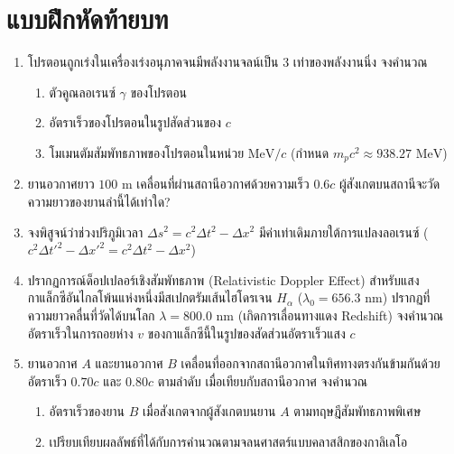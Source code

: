 \section{แบบฝึกหัดท้ายบท}
\begin{enumerate}
    \item โปรตอนถูกเร่งในเครื่องเร่งอนุภาคจนมีพลังงานจลน์เป็น 3 เท่าของพลังงานนิ่ง จงคำนวณ
    \begin{enumerate}
        \item ตัวคูณลอเรนซ์ $\gamma$ ของโปรตอน
        \item อัตราเร็วของโปรตอนในรูปสัดส่วนของ $c$
        \item โมเมนตัมสัมพัทธภาพของโปรตอนในหน่วย $\text{MeV}/c$ (กำหนด $m_p c^2 \approx 938.27\text{ MeV}$)
    \end{enumerate}
    \item ยานอวกาศยาว $100\text{ m}$ เคลื่อนที่ผ่านสถานีอวกาศด้วยความเร็ว $0.6c$ ผู้สังเกตบนสถานีจะวัดความยาวของยานลำนี้ได้เท่าใด?
    \item จงพิสูจน์ว่าช่วงปริภูมิเวลา $\Delta s^2 = c^2 \Delta t^2 - \Delta x^2$ มีค่าเท่าเดิมภายใต้การแปลงลอเรนซ์ ($c^2 \Delta t'^2 - \Delta x'^2 = c^2 \Delta t^2 - \Delta x^2$)
    \item ปรากฏการณ์ด็อปเปลอร์เชิงสัมพัทธภาพ (Relativistic Doppler Effect) สำหรับแสง กาแล็กซีอันไกลโพ้นแห่งหนึ่งมีสเปกตรัมเส้นไฮโดรเจน $H_\alpha$ ($\lambda_0 = 656.3\text{ nm}$) ปรากฏที่ความยาวคลื่นที่วัดได้บนโลก $\lambda = 800.0\text{ nm}$ (เกิดการเลื่อนทางแดง Redshift) จงคำนวณอัตราเร็วในการถอยห่าง $v$ ของกาแล็กซีนี้ในรูปของสัดส่วนอัตราเร็วแสง $c$
    \item ยานอวกาศ $A$ และยานอวกาศ $B$ เคลื่อนที่ออกจากสถานีอวกาศในทิศทางตรงกันข้ามกันด้วยอัตราเร็ว $0.70c$ และ $0.80c$ ตามลำดับ เมื่อเทียบกับสถานีอวกาศ จงคำนวณ
    \begin{enumerate}
        \item อัตราเร็วของยาน $B$ เมื่อสังเกตจากผู้สังเกตบนยาน $A$ ตามทฤษฎีสัมพัทธภาพพิเศษ
        \item เปรียบเทียบผลลัพธ์ที่ได้กับการคำนวณตามจลนศาสตร์แบบคลาสสิกของกาลิเลโอ
    \end{enumerate}
\end{enumerate}
